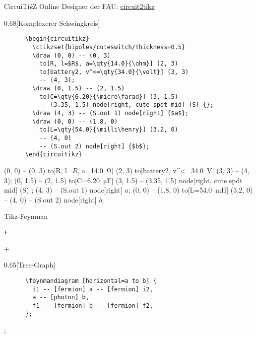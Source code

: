 \begin{frame}[fragile]{CircuiTi\textit{k}Z}
  Online Designer der FAU: \href{https://www.circuit2tikz.tf.fau.de/designer/}{circuit2tikz}
  \begin{CodeExample}{0.68}[Komplexerer Schwingkreis]
    \begin{verbatim}
      \begin{circuitikz}
        \ctikzset{bipoles/cuteswitch/thickness=0.5}
        \draw (0, 0) -- (0, 3)
          to[R, l=$R$, a=\qty{14.0}{\ohm}] (2, 3)
          to[battery2, v^<=\qty{34.0}{\volt}] (3, 3)
          -- (4, 3);
        \draw (0, 1.5) -- (2, 1.5)
          to[C=\qty{6.20}{\micro\farad}] (3, 1.5)
          -- (3.35, 1.5) node[right, cute spdt mid] (S) {};
        \draw (4, 3) -- (S.out 1) node[right] {$a$};
        \draw (0, 0) -- (1.8, 0)
          to[L=\qty{54.0}{\milli\henry}] (3.2, 0)
          -- (4, 0)
          -- (S.out 2) node[right] {$b$};
      \end{circuitikz}
    \end{verbatim}
  \CodeResult
    \begin{circuitikz}
        \draw (0, 0) -- (0, 3)
          to[R, l=$R$, a=\qty{14.0}{\ohm}] (2, 3)
          to[battery2, v^<=\qty{34.0}{\volt}] (3, 3)
          -- (4, 3);
        \draw (0, 1.5) -- (2, 1.5)
          to[C=\qty{6.20}{\micro\farad}] (3, 1.5)
          -- (3.35, 1.5) node[right, cute spdt mid] (S) {};
        \draw (4, 3) -- (S.out 1) node[right] {$a$};
        \draw (0, 0) -- (1.8, 0)
          to[L=\qty{54.0}{\milli\henry}] (3.2, 0)
          -- (4, 0)
          -- (S.out 2) node[right] {$b$};
     \end{circuitikz}
  \end{CodeExample}
\end{frame}

\begin{frame}[fragile]{%
  Tikz-Feynman
  \hfill
}
  \begin{Packages}
    \texttt+\usepackage{tikz-feynman}+
  \end{Packages}
  \begin{CodeExample}{0.65}[Tree-Graph]
    \begin{verbatim}
      \feynmandiagram [horizontal=a to b] {
        i1 -- [fermion] a -- [fermion] i2,
        a -- [photon] b,
        f1 -- [fermion] b -- [fermion] f2,
      };
    \end{verbatim}
  \CodeResult
    ;
  \end{CodeExample}
\end{frame}

